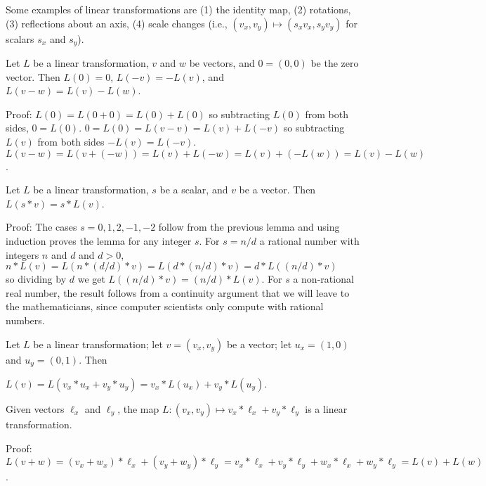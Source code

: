 \documentclass[12pt]{article}
\begin{document}
Some examples of linear transformations are (1) the identity map,
(2) rotations, (3) reflections about an axis, (4) scale changes
(i.e., $(v_x,v_y)\longmapsto(s_x v_x,s_y v_y)$ for scalars $s_x$
and $s_y$).


\begin{lemma}
Let $L$ be a linear transformation, $v$ and $w$ be vectors,
and $0=(0,0)$ be the zero vector.  Then $L(0)=0$,  $L(-v)=-L(v)$,
and $L(v-w) = L(v) - L(w)$.
\end{lemma}
\begin{indpar}{0.5in}
Proof: $L(0) = L(0+0)= L(0) + L(0)$ so subtracting $L(0)$
from both sides, $0=L(0)$.  $0 = L(0) = L(v-v) = L(v) + L(-v)$
so subtracting $L(v)$ from both sides $-L(v)=L(-v)$.
$L(v-w)=L(v+(-w))=L(v)+L(-w)=L(v)+(-L(w))=L(v)-L(w)$.
\end{indpar}

\begin{lemma}
Let $L$ be a linear transformation, $s$ be a scalar, and $v$ be a vector.
Then $L(s*v)=s*L(v)$.
\end{lemma}
\begin{indpar}{0.5in}
Proof: The cases $s=0,1,2,-1,-2$ follow from the previous lemma and
using induction proves the lemma for any integer $s$.  For $s=n/d$
a rational number with integers $n$ and $d$ and $d>0$, \\
\hspace*{0.1in}$n*L(v) = L(n*(d/d)*v) = L(d*(n/d)*v)=d*L((n/d)*v)$ \\
so dividing by $d$
we get $L((n/d)*v)=(n/d)*L(v)$.  For $s$ a non-rational real number,
the result follows from a continuity argument that we will leave
to the mathematicians, since computer scientists only compute
with rational numbers.
\end{indpar}

Let $L$ be a linear transformation; let $v=(v_x,v_y)$ be a vector;
let $u_x=(1,0)$ and $u_y =(0,1)$.  Then \\
\centerline{$L(v) = L(v_x*u_x+v_y*u_y)=v_x*L(u_x)+v_y*L(u_y)$.}

\begin{lemma}
Given vectors $\ell_x$ and $\ell_y$, the map
$L:(v_x,v_y)\longmapsto v_x*\ell_x+v_y*\ell_y$ is a linear
transformation.
\end{lemma}
\begin{indpar}{0.5in}
Proof: $L(v+w) = (v_x+w_x)*\ell_x+(v_y+w_y)*\ell_y
               = v_x*\ell_x+v_y*\ell_y+w_x*\ell_x+w_y*\ell_y
	       = L(v) + L(w)$.
\end{indpar}
\end{document}

